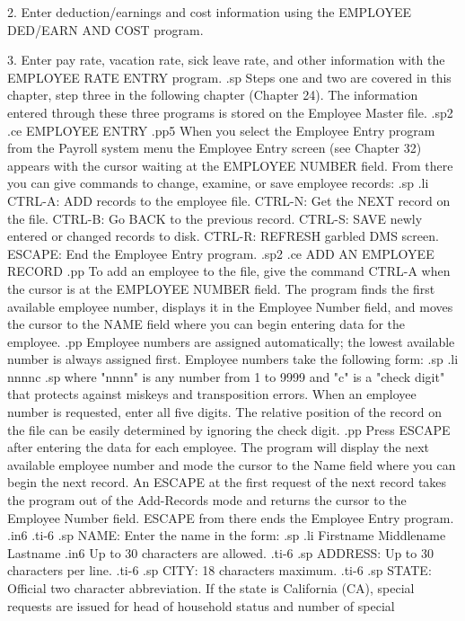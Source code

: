 	2. Enter deduction/earnings and cost
	   information using the EMPLOYEE
	   DED/EARN AND COST program.

	3. Enter pay rate, vacation rate, sick
	   leave rate, and other information
	   with the EMPLOYEE RATE ENTRY program.
.sp
Steps one and two are covered in this chapter, step three in the following
chapter (Chapter 24). The information entered through these three programs
is stored on the Employee Master file.
.sp2
.ce
EMPLOYEE ENTRY
.pp5
When you select the Employee Entry program from the Payroll system
menu the Employee Entry screen (see Chapter 32) appears with the cursor
waiting at the EMPLOYEE NUMBER field.
From there
you can give commands to change, examine,
or save employee records:
.sp
.li
	  CTRL-A:  ADD records to the employee file.
	  CTRL-N:  Get the NEXT record on the file.
	  CTRL-B:  Go BACK to the previous record.
	  CTRL-S:  SAVE newly entered or changed records
		   to disk.
	  CTRL-R:  REFRESH garbled DMS screen.
	  ESCAPE:  End the Employee Entry program.
.sp2
.ce
ADD AN EMPLOYEE RECORD
.pp
To add an employee to the file, give the command
CTRL-A when the cursor is at the EMPLOYEE NUMBER field.
The program finds the first available employee number, displays it in
the Employee Number field, and moves the cursor to the NAME field
where you can begin entering data for the employee.
.pp
Employee
numbers are assigned automatically; the lowest available number is always
assigned first.  Employee numbers take the following form:
.sp
.li
		  nnnnc
.sp
where "nnnn" is any number from 1 to 9999 and "c" is a "check digit"
that protects against miskeys and transposition errors.  When
an employee number is requested, enter all five digits.  The relative
position of the record on the file can be easily determined by
ignoring the check digit.
.pp
Press ESCAPE after entering the data for each employee.  The program
will display the next available employee number and mode the cursor
to the Name field where you can begin the next record.
An ESCAPE at the first request of the
next record takes the program out of the Add-Records mode and returns
the cursor to the Employee Number field.  ESCAPE from there ends the
Employee Entry program.
.in6
.ti-6
.sp
NAME: Enter the name in the form:
.sp
.li
		   Firstname Middlename Lastname
.in6
Up to 30 characters are allowed.
.ti-6
.sp
ADDRESS: Up to 30 characters per line.
.ti-6
.sp
CITY: 18 characters maximum.
.ti-6
.sp
STATE: Official two character abbreviation.  If the state is California (CA),
special requests are issued for head of household status and number of special
